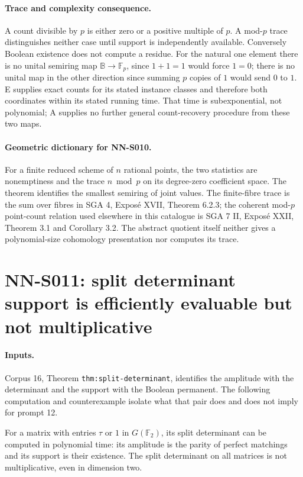 \paragraph{Trace and complexity consequence.}
A count divisible by $p$ is either zero or a positive multiple
of $p$. A mod-$p$ trace distinguishes neither case until support
is independently available. Conversely Boolean existence does
not compute a residue. For the natural one element there is
no unital semiring map $\mathbb B\to\mathbb F_p$, since
$1+1=1$ would force $1=0$; there is no unital map in the other
direction since summing $p$ copies of $1$ would send $0$ to $1$.
E supplies exact counts for its stated instance classes and
therefore both coordinates within its stated running time.
That time is subexponential, not polynomial; A supplies no
further general count-recovery procedure from these two maps.

\paragraph{Geometric dictionary for NN-S010.}
For a finite reduced scheme of $n$ rational points, the two
statistics are nonemptiness and the trace $n\bmod p$ on its
degree-zero coefficient space. The theorem identifies the
smallest semiring of joint values. The finite-fibre trace is
the sum over fibres in SGA 4, Expos\'e XVII, Theorem 6.2.3;
the coherent mod-$p$ point-count relation used elsewhere in
this catalogue is SGA 7 II, Expos\'e XXII, Theorem 3.1 and
Corollary 3.2. The abstract quotient itself neither gives a
polynomial-size cohomology presentation nor computes its trace.

\section{NN-S011: split determinant support is efficiently evaluable but not multiplicative}
\label{sec:NN-S011}

\paragraph{Inputs.}
Corpus 16, Theorem \texttt{thm:split-determinant}, identifies the
amplitude with the determinant and the support with the Boolean
permanent. The following computation and counterexample isolate
what that pair does and does not imply for prompt 12.

\begin{theorem}[NN-S011]
For a matrix with entries $\tau$ or $1$ in $G(\mathbb F_2)$,
its split determinant can be computed in polynomial time: its
amplitude is the parity of perfect matchings and its support is
their existence. The split determinant on all matrices is not
multiplicative, even in dimension two.
\end{theorem}

